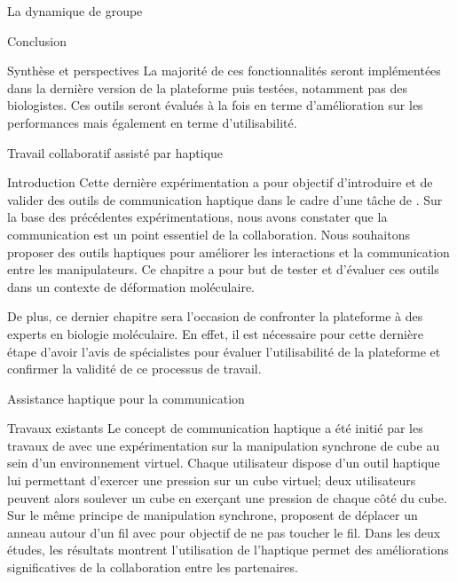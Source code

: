 \documentclass[myfrancais,ngerman,english,french]{mythesis}
\begin{document}
\begin{mychapter}{La dynamique de groupe}
\begin{mysection}{Conclusion}
\begin{mysubsection}{Synthèse et perspectives}
				La majorité de ces fonctionnalités seront implémentées dans la dernière version de la plateforme puis testées, notamment pas des biologistes.
				Ces outils seront évalués à la fois en terme d'amélioration sur les performances mais également en terme d'utilisabilité.
			\end{mysubsection}
		\end{mysection}
	\end{mychapter}
	\begin{mychapter}{Travail collaboratif assisté par haptique}
		\begin{mysection}{Introduction}
			Cette dernière expérimentation a pour objectif d'introduire et de valider des outils de communication haptique dans le cadre d'une tâche de .
			Sur la base des précédentes expérimentations, nous avons constater que la communication est un point essentiel de la collaboration.
			Nous souhaitons proposer des outils haptiques pour améliorer les interactions et la communication entre les manipulateurs.
			Ce chapitre a pour but de tester et d'évaluer ces outils dans un contexte de déformation moléculaire.

			De plus, ce dernier chapitre sera l'occasion de confronter la plateforme \myShaddock à des experts en biologie moléculaire.
			En effet, il est nécessaire pour cette dernière étape d'avoir l'avis de spécialistes pour évaluer l'utilisabilité de la plateforme et confirmer la validité de ce processus de travail.
		\end{mysection}
		\begin{mysection}{Assistance haptique pour la communication}
			\begin{mysubsection}{Travaux existants}
				Le concept de communication haptique a été initié par les travaux de  avec une expérimentation sur la manipulation synchrone de cube au sein d'un environnement virtuel.
				Chaque utilisateur dispose d'un outil haptique lui permettant d'exercer une pression sur un cube virtuel; deux utilisateurs peuvent alors soulever un cube en exerçant une pression de chaque côté du cube.
				Sur le même principe de manipulation synchrone,  proposent de déplacer un anneau autour d'un fil avec pour objectif de ne pas toucher le fil.
				Dans les deux études, les résultats montrent l'utilisation de l'haptique permet des améliorations significatives de la collaboration entre les partenaires.


\end{mysubsection}
\end{mysection}
\end{mychapter}
\end{document}
